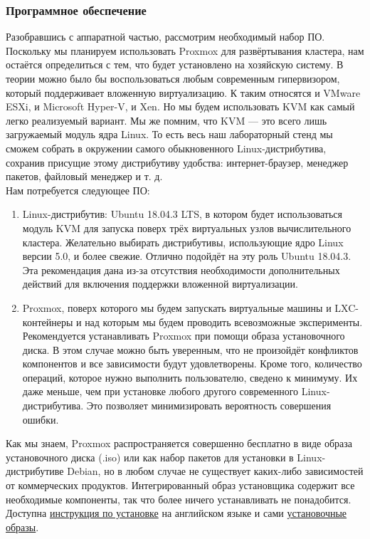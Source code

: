 \documentclass[14pt, a4paper]{article}
\begin{document}
\subsubsection*{Программное обеспечение} 

Разобравшись с аппаратной частью, рассмотрим необходимый набор ПО. Поскольку мы планируем
использовать Proxmox для развёртывания кластера, нам остаётся определиться с тем, что будет
установлено на хозяйскую систему. В теории можно было бы воспользоваться любым современным
гипервизором, который поддерживает вложенную виртуализацию. К таким относятся и VMware ESXi, и
Microsoft Hyper-V, и Xen. Но мы будем использовать KVM как самый легко реализуемый вариант. Мы
же помним, что KVM — это всего лишь загружаемый модуль ядра Linux. То есть весь наш
лабораторный стенд мы сможем собрать в окружении самого обыкновенного Linux-дистрибутива,
сохранив присущие этому дистрибутиву удобства: интернет-браузер, менеджер пакетов, файловый
менеджер и т. д.\\

Нам потребуется следующее ПО:
\begin{enumerate}
    \item Linux-дистрибутив: Ubuntu 18.04.3 LTS, в котором будет использоваться модуль KVM для
    запуска поверх трёх виртуальных узлов вычислительного кластера. Желательно выбирать
    дистрибутивы, использующие ядро Linux версии 5.0, и более свежие. Отлично подойдёт на эту
    роль Ubuntu 18.04.3. Эта рекомендация дана из-за отсутствия необходимости дополнительных
    действий для включения поддержки вложенной виртуализации.
    \item Proxmox, поверх которого мы будем запускать виртуальные машины и LXC-контейнеры и над
    которым мы будем проводить всевозможные эксперименты. Рекомендуется устанавливать
    Proxmox при помощи образа установочного диска. В этом случае можно быть уверенным, что
    не произойдёт конфликтов компонентов и все зависимости будут удовлетворены. Кроме того,
    количество операций, которое нужно выполнить пользователю, сведено к минимуму. Их даже
    меньше, чем при установке любого другого современного Linux-дистрибутива. Это позволяет
    минимизировать вероятность совершения ошибки.
\end{enumerate}

Как мы знаем, Proxmox распространяется совершенно бесплатно в виде образа установочного диска
(.iso) или как набор пакетов для установки в Linux-дистрибутиве Debian, но в любом случае не
существует каких-либо зависимостей от коммерческих продуктов. Интегрированный образ
установщика содержит все необходимые компоненты, так что более ничего устанавливать не
понадобится. Доступна \href{https://pve.proxmox.com/wiki/Installation}{инструкция по установке} 
на английском языке и сами \href{https://www.proxmox.com/en/downloads}{установочные образы}.
\end{document}
